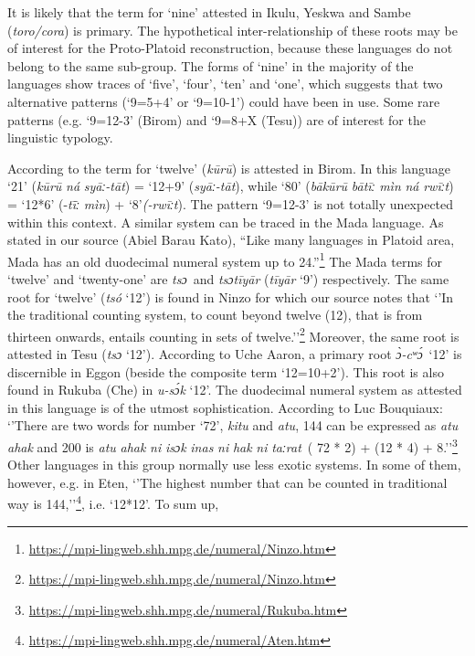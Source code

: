 It is likely that the term for ‘nine’ attested in Ikulu, Yeskwa and Sambe (\textit{toro/cora}) is primary. The hypothetical inter-relationship of these roots may be of interest for the Proto-Platoid reconstruction, because these languages do not belong to the same sub-group. The forms of ‘nine’ in the majority of the languages show traces of ‘five’, ‘four’, ‘ten’ and ‘one’, which suggests that two alternative patterns (‘9=5+4’ or ‘9=10-1’) could have been in use. Some rare patterns (e.g. ‘9=12-3’ (Birom) and ‘9=8+X (Tesu)) are of interest for the linguistic typology.

According to \citet{Bouquiaux1962} the term for ‘twelve’ (\textit{k{\={u}}r{\={u}}}) is attested in Birom.  In this language ‘21’ (\textit{k{\={u}}r{\={u}}} \textit{ná} \textit{sy{\={a}}ː-t{\={a}}t}) = ‘12+9’ (\textit{sy{\={a}}ː-t{\={a}}t}), while ‘80’ (\textit{b{\={a}}k{\={u}}r{\={u}}} \textit{b{\={a}}t{\={i}}ː} \textit{mìn} \textit{ná} \textit{rw{\={i}}ːt}) = ‘12*6’ (-\textit{t{\={\={i}}}ː} \textit{mìn}) + ‘8’\textit{(-rw{\={i}}ːt}). The pattern ‘9=12-3’ is not totally unexpected within this context. A similar system can be traced in the Mada language. As stated in our source (Abiel Barau Kato), “Like many languages in Platoid area, Mada has an old duodecimal numeral system up to 24.”\footnote{\href{https://mpi-lingweb.shh.mpg.de/numeral/Ninzo.htm}{https://mpi-lingweb.shh.mpg.de/numeral/Ninzo}\href{https://mpi-lingweb.shh.mpg.de/numeral/Ninzo.htm}{.htm}} The Mada terms for ‘twelve’ and ‘twenty-one’ are \textit{tsɔ}~and \textit{tsɔt{\={i}}y{\={a}}r} (\textit{t{\={i}}y{\={a}}r} ‘9’) respectively. The same root for ‘twelve’ (\textit{tsó} ‘12’) is found in Ninzo for which our source notes that ‘’In the traditional counting system, to count beyond twelve (12), that is from thirteen onwards, entails counting in sets of twelve.’’\footnote{\href{https://mpi-lingweb.shh.mpg.de/numeral/Ninzo.htm}{https://mpi-lingweb.shh.mpg.de/numeral/Ninzo}\href{https://mpi-lingweb.shh.mpg.de/numeral/Ninzo.htm}{.htm}} Moreover, the same root is attested in Tesu (\textit{tsɔ} ‘12’). According to Uche Aaron, a primary root \textit{{\`{ɔ}}-cʷ{\'{ɔ}}}~‘12’ is discernible in Eggon (beside the composite term ‘12=10+2’). This root is also found in Rukuba (Che) in \textit{u-s{\'{ɔ}}k} ‘12’. The duodecimal numeral system as attested in this language is of the utmost sophistication. According to Luc Bouquiaux: ‘’There are two words for number `72', \textit{kitu} and \textit{atu}, 144 can be expressed as \textit{atu} \textit{ahak} and 200 is \textit{atu} \textit{ahak} \textit{ni} \textit{isɔk} \textit{inas} \textit{ni} \textit{hak} \textit{ni} \textit{taːrat}~( 72 * 2) + (12 * 4) + 8.’’\footnote{\href{https://mpi-lingweb.shh.mpg.de/numeral/Rukuba.htm}{https://mpi-lingweb.shh.mpg.de/numeral/Rukuba}\href{https://mpi-lingweb.shh.mpg.de/numeral/Rukuba.htm}{.htm}} Other languages in this group normally use less exotic systems. In some of them, however, e.g. in Eten, ‘’The highest number that can be counted in traditional way is 144,’’\footnote{\url{https://mpi-lingweb.shh.mpg.de/numeral/Aten.htm}}, i.e. ‘12*12’. To sum up, 